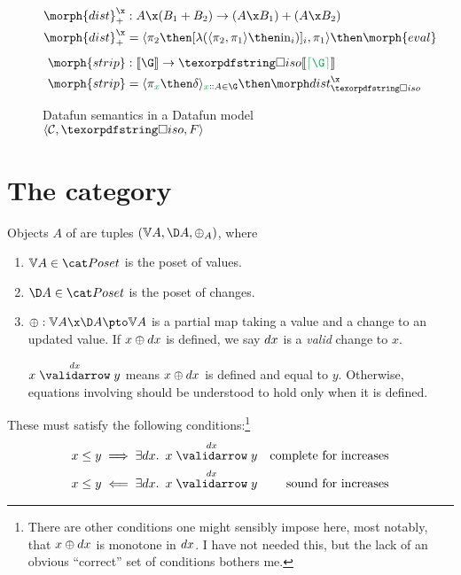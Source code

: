 \documentclass[nomarginums]{rntz}\usepackage[tablet]{fantasy}%
\begin{document}
\begin{figure*}
  \vspace{.5\baselineskip}

  \begin{align*}
    \morph{dist}^\x_+ &: A \x (B_1 + B_2) \to (A \x B_1) + (A \x B_2)\\
    \morph{dist}^\x_+ &= \fork{\pi_2 \then \krof{\lambda (\fork{\pi_2,\pi_1} \then \injc_i)}_i, \pi_1}
    \then \morph{eval}
    \\[1ex]
    \morph{strip} &: \den\G \to \discof{\den{\stripcxd\G}}\\
    \morph{strip} &= \fork{\pi_{\dvar x} \then \delta}_{\hd x A \in \G} \then \discox
  \end{align*}


  \caption{Datafun semantics in a Datafun model $\tuple{\catC, \disco, \down}$}
  \label{fig:general-semantics}
\end{figure*}


\section{The category \CP}
\label{sec:changeposets}

Objects $A$ of \CP{} are tuples $(\vals A, \chgs A, \updfn_A)$, where
%
\begin{enumerate}
\item $\vals A \in \Poset$ is the poset of values.

\item $\chgs A \in \Poset$ is the poset of changes.

\item $\updfn : \vals A \x \chgs A \pto \vals A$ is a partial map taking a value
  and a change to an updated value. If $x \mathbin{\oplus} dx$ is defined, we say $dx$ is a
  \emph{valid} change to $x$.

  $\vld{\dx} x y$ means $x \mathbin{\oplus} dx$ is defined and equal to $y$. Otherwise,
  equations inv\-olv\-ing \updfn{} should be understood to hold only when it is
  defined.
\end{enumerate}

\noindent
These must satisfy the following conditions:\footnote{There are other conditions
  one might sensibly impose here, most notably, that $x \mathbin{\oplus} dx$ is monotone in
  $dx$. I have not needed this, but the lack of an obvious ``correct'' set of
  conditions bothers me.}
%
\begin{align*}
  x \le y &\implies \ex{\dx} \vld{\dx} x y
  & \text{complete for increases}\\
  x \le y &\impliedby \ex{\dx} \vld{\dx} x y
  & \text{sound for increases}
\end{align*}
\end{document}
